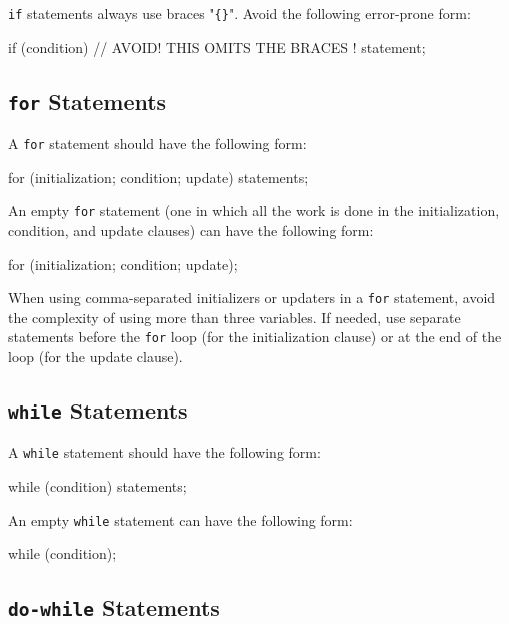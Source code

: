 \documentclass{article}
\newenvironment{note}[1]
  {\begin{notes}\item #1}{\end{notes}}
\begin{document}
\begin{note}
\texttt{if} statements always use braces "\texttt{\{\}}". Avoid the following error-prone form:

\begin{snippet}
if (condition)  // AVOID! THIS OMITS THE BRACES {}!
    statement;
\end{snippet}
\end{note}

\subsection{\texttt{for} Statements}

A \texttt{for} statement should have the following form:

\begin{snippet}
for (initialization; condition; update) {
    statements;
}
\end{snippet}

An empty \texttt{for} statement (one in which all the work is done in the initialization, condition,
and update clauses) can have the following form:

\begin{snippet}
for (initialization; condition; update);
\end{snippet}

When using comma-separated initializers or updaters in a \texttt{for} statement, avoid the
complexity of using more than three variables. If needed, use separate statements before the
\texttt{for} loop (for the initialization clause) or at the end of the loop (for the update clause).

\subsection{\texttt{while} Statements}

A \texttt{while} statement should have the following form:

\begin{snippet}
while (condition) {
    statements;
}
\end{snippet}

An empty \texttt{while} statement can have the following form:

\begin{snippet}
while (condition);
\end{snippet}

\subsection{\texttt{do-while} Statements}
\end{document}
